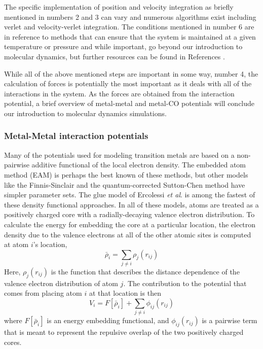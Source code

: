 The specific implementation of position and velocity integration as briefly
mentioned in numbers 2 and 3 can vary and numerous algorithms exist including
verlet\citep{Verlet:1967aa} and velocity-verlet
integration.\citep{Dullweber:1997aa} The conditions mentioned in number 6 are
in reference to methods that can ensure that the system is maintained at a
given temperature or pressure and while important, go beyond our introduction
to molecular dynamics, but further resources can be found in References
\citep{Hoover:1985aa, Melchionna:1993aa, Leach:2001aa}.

While all of the above mentioned steps are important in some way, number 4, the
calculation of forces is potentially the most important as it deals with all of
the interactions in the system. As the forces are obtained from the interaction
potential, a brief overview of metal-metal and metal-CO potentials
will conclude our introduction to molecular dynamics simulations.

\subsubsection{Metal-Metal interaction potentials}
Many of the potentials used for modeling transition metals are based
on a non-pairwise additive functional of the local electron
density. The embedded atom method (EAM) is perhaps the best known of
these
methods,\citep{Foiles:1986ky, Daw:1984aq, Johnson:1989yr, Daw:1989ci, Plimpton:1993qi, Voter:1995ax, Lu:1997fv, Alemany:1998fp}
but other models like the Finnis-Sinclair\citep{Finnis:1984hl, Sutton:1990rr} and
the quantum-corrected Sutton-Chen method\citep{Goddard:1998qsc, Qi:1999dn} have simpler
parameter sets. The glue model of Ercolessi {\it et
  al}.\citep{Ercolessi:1988uo} is among the fastest of these density
functional approaches. In all of these models, atoms are treated as a
positively charged core with a radially-decaying valence electron
distribution. To calculate the energy for embedding the core at a
particular location, the electron density due to the valence electrons
at all of the other atomic sites is computed at atom $i$'s location,
\begin{equation}
\bar{\rho}_i = \sum_{j\neq i} \rho_j(r_{ij})
\end{equation}
Here, $\rho_j(r_{ij})$ is the function that describes the distance
dependence of the valence electron distribution of atom $j$. The
contribution to the potential that comes from placing atom $i$ at that
location is then
\begin{equation}
V_i =  F[ \bar{\rho}_i ]  + \sum_{j \neq i} \phi_{ij}(r_{ij})
\end{equation}
where $F[ \bar{\rho}_i ]$ is an energy embedding functional, and
$\phi_{ij}(r_{ij})$ is a pairwise term that is meant to represent the
repulsive overlap of the two positively charged cores.  

